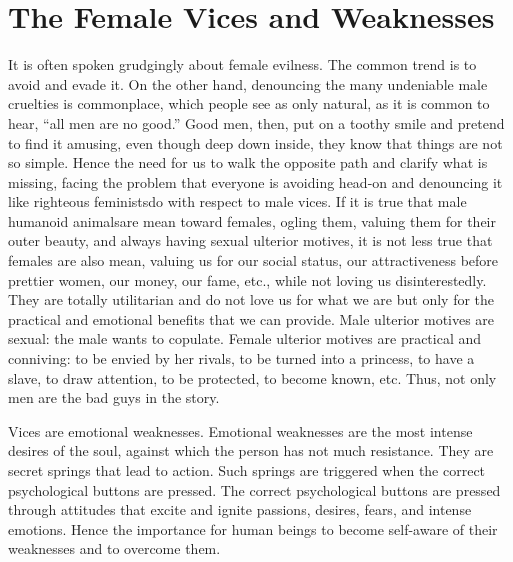 \section{The Female Vices and Weaknesses}

\par It is often spoken grudgingly about female evilness. The common trend is to avoid and evade it. On the other hand, denouncing the many undeniable male cruelties is commonplace, which people see as only natural, as it is common to hear, \enquote{all men are no good.} Good men, then, put on a toothy smile and pretend to find it amusing, even though deep down inside, they know that things are not so simple. Hence the need for us to walk the opposite path and clarify what is missing, facing the problem that everyone is avoiding head-on and denouncing it like righteous feminists\footnotemark[36] do with respect to male vices. If it is true that male humanoid animals\footnotemark[37] are mean toward females, ogling them, valuing them for their outer beauty, and always having sexual ulterior motives, it is not less true that females are also mean, valuing us for our social status, our attractiveness before prettier women, our money, our fame, etc., while not loving us disinterestedly. They are totally utilitarian and do not love us for what we are but only for the practical and emotional benefits that we can provide. Male ulterior motives are sexual: the male wants to copulate. Female ulterior motives are practical and conniving: to be envied by her rivals, to be turned into a princess, to have a slave, to draw attention, to be protected, to become known, etc. Thus, not only men are the bad guys in the story.



\par Vices are emotional weaknesses. Emotional weaknesses are the most intense desires of the soul, against which the person has not much resistance. They are secret springs that lead to action. Such springs are triggered when the correct psychological buttons are pressed. The correct psychological buttons are pressed through attitudes that excite and ignite passions, desires, fears, and intense emotions. Hence the importance for human beings to become self-aware of their weaknesses and to overcome them.

